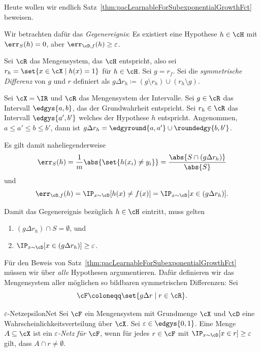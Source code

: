 \documentclass[language=ngerman,algolist,acrolist]{TemplateLecture}
\begin{document}
Heute wollen wir endlich Satz~\ref{thm:pacLearnableForSubexponentialGrowthFct} beweisen.

Wir betrachten dafür das \emph{Gegenereignis}: Es existiert eine Hypothese $h \in \cH$ mit $\err_S(h) = 0$, aber $\err_{\cD, f}(h) \geq \varepsilon$.

Sei $\cR$ das Mengensystem, das $\cH$ entspricht, also sei $r_h = \set{x \in \cX \mid h(x) = 1}$ für $h \in \cH$. Sei $g = r_f$. Sei die \emph{symmetrische Differenz} von $g$ und $r$ definiert als $g \Delta r_h \coloneqq (g \setminus r_h) \cup (r_h \setminus g)$.

\begin{expl}
    Sei $\cX = \IR$ und $\cR$ das Mengensystem der Intervalle. Sei $g \in \cR$ das Intervall $\edgys{a, b}$, das der Grundwahrheit entspricht. Sei $r_h \in \cR$ das Intervall $\edgys{a', b'}$ welches der Hypothese $h$ entspricht. Angenommen, $a \leq a' \leq b \leq b'$, dann ist $g \Delta r_h = \edgyround{a, a'} \cup \roundedgy{b, b'}$.
\end{expl}
Es gilt damit naheliegenderweise
\begin{equation*}
    \err_S(h) = \frac{1}{m} \abs{\set{h(x_i) \neq y_i}} = \frac{\abs{S \cap (g \Delta r_h)}}{\abs{S}}
\end{equation*}
und 
\begin{equation*}
    \err_{\cD, f}(h) = \IP_{x \sim \cD} [h(x) \neq f(x)] = \IP_{x \sim \cD} [x \in (g \Delta r_h)].
\end{equation*}

Damit das Gegenereignis bezüglich $h \in \cH$ eintritt, muss gelten 
\begin{enumerate}[$(i)$]
    \item $(g \Delta r_h) \cap S = \emptyset$, und
    \item $\IP_{x \sim \cD} [x \in (g \Delta r_h)] \geq \varepsilon$.
\end{enumerate}

Für den Beweis von Satz~\ref{thm:pacLearnableForSubexponentialGrowthFct} müssen wir über \emph{alle} Hypothesen argumentieren. Dafür definieren wir das Mengensystem aller möglichen so bildbaren symmetrischen Differenzen: Sei 
\begin{equation*}
    \cF \coloneqq \set{g \Delta r \mid r \in \cR}.
\end{equation*}

\begin{defi}{$\varepsilon$-Netz}{epsilonNet}
    Sei $\cF$ ein Mengensystem mit Grundmenge $\cX$ und $\cD$ eine Wahrscheinlichkeitsverteilung über $\cX$. Sei $\varepsilon \in \edgys{0,1}$. Eine Menge $A \subseteq \cX$ ist ein \emph{$\varepsilon$-Netz für $\cF$}, wenn für jedes $r \in \cF$ mit $\IP_{x \sim \cD}[x \in r] \geq \varepsilon$ gilt, dass $A \cap r \neq \emptyset$.
\end{defi}
\end{document}
